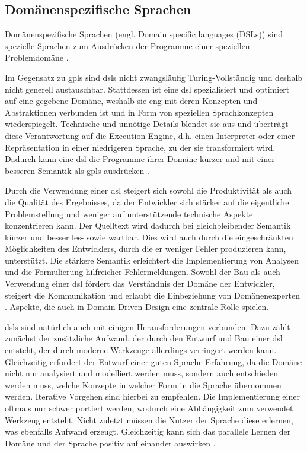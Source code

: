 \subsection{Domänenspezifische Sprachen}
    Domänenspezifische Sprachen (engl. Domain specific languages (DSLs))
    sind spezielle Sprachen zum Ausdrücken der Programme einer speziellen
    Problemdomäne \cite[Kapitel 2.2]{voelter:DslEngineering}.

    Im Gegensatz zu \glspl{gpl} sind \glspl{dsl} nicht zwangsläufig Turing-Vollständig
    und deshalb nicht generell austauschbar.
    Stattdessen ist eine \gls{dsl} spezialisiert und optimiert auf eine gegebene Domäne,
    weshalb sie eng mit deren Konzepten und Abstraktionen verbunden ist
    und in Form von speziellen Sprachkonzepten wiederspiegelt.
    Technische und unnötige Details blendet sie aus und überträgt diese Verantwortung
    auf die Execution Engine, d.h. einen Interpreter oder einer Repräsentation in einer
    niedrigeren Sprache, zu der sie transformiert wird.
    Dadurch kann eine \gls{dsl} die Programme ihrer Domäne kürzer und mit einer besseren Semantik
    als \glspl{gpl} ausdrücken \cite[Kapitel 2.2]{voelter:DslEngineering}.

    Durch die Verwendung einer \gls{dsl} steigert sich sowohl die Produktivität
    als auch die Qualität des Ergebnisses,
    da der Entwickler sich stärker auf die eigentliche Problemstellung und weniger
    auf unterstützende technische Aspekte konzentrieren kann.
    Der Quelltext wird dadurch bei gleichbleibender Semantik kürzer und besser les- sowie wartbar.
    Dies wird auch durch die eingeschränkten Möglichkeiten des Entwicklers,
    durch die er weniger Fehler produzieren kann, unterstützt.
    Die stärkere Semantik erleichtert die Implementierung von Analysen und die Formulierung
    hilfreicher Fehlermeldungen.
    Sowohl der Bau als auch Verwendung einer \gls{dsl} fördert das Verständnis der Domäne
    der Entwickler, steigert die Kommunikation und erlaubt die Einbeziehung von Domänenexperten
    \cite[Kapitel 2.5]{voelter:DslEngineering}.
    Aspekte, die auch in \citet{evans:DomainDrivenDesign} Domain Driven Design eine zentrale Rolle spielen.

    \glspl{dsl} sind natürlich auch mit einigen Herausforderungen verbunden.
    Dazu zählt zunächst der zusätzliche Aufwand, der durch den Entwurf und Bau einer \gls{dsl} entsteht,
    der durch moderne Werkzeuge allerdings verringert werden kann.
    Gleichzeitig erfordert der Entwurf einer guten Sprache Erfahrung,
    da die Domäne nicht nur analysiert und modelliert werden muss,
    sondern auch entschieden werden muss, welche Konzepte in welcher Form in die Sprache übernommen werden.
    Iterative Vorgehen sind hierbei zu empfehlen.
    Die Implementierung einer oftmals nur schwer portiert werden,
    wodurch eine Abhängigkeit zum verwendet Werkzeug entsteht.
    Nicht zuletzt müssen die Nutzer der Sprache diese erlernen,
    was ebenfalls Aufwand erzeugt.
    Gleichzeitig kann sich das parallele Lernen der Domäne und der Sprache positiv auf einander auswirken
    \cite[Kapitel 2.6]{voelter:DslEngineering}.


